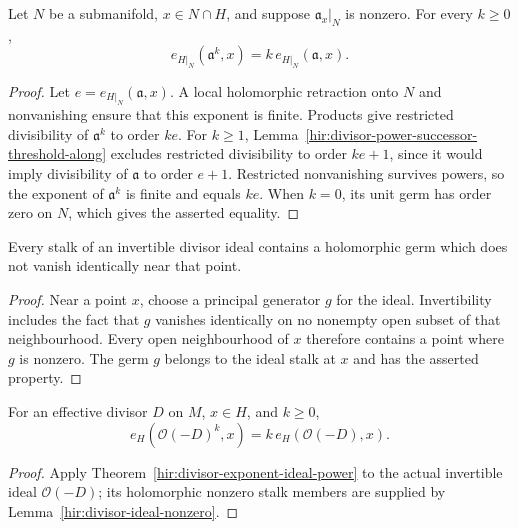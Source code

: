 \begin{theorem}
\label{hir:divisor-exponent-ideal-power-along}
\leanok
Let $N$ be a submanifold, $x\in N\cap H$, and suppose
$\mathfrak a_x|_N$ is nonzero. For every $k\geq0$,
\[
 e_{H|_N}(\mathfrak a^k,x)=k\,e_{H|_N}(\mathfrak a,x).
\]
\end{theorem}
\begin{proof}
Let $e=e_{H|_N}(\mathfrak a,x)$.  A local holomorphic retraction
onto $N$ and nonvanishing ensure that this exponent is finite.
Products give restricted divisibility of $\mathfrak a^k$ to order $ke$.
For $k\geq1$, Lemma~\ref{hir:divisor-power-successor-threshold-along}
excludes restricted divisibility to order $ke+1$, since it would imply
divisibility of $\mathfrak a$ to order $e+1$. Restricted nonvanishing
survives powers, so the exponent of $\mathfrak a^k$ is finite and equals
$ke$. When $k=0$, its unit germ has order zero on $N$, which gives
the asserted equality.
\end{proof}

\begin{lemma}
\label{hir:divisor-ideal-nonzero}
\leanok
Every stalk of an invertible divisor ideal contains a holomorphic germ
which does not vanish identically near that point.
\end{lemma}
\begin{proof}
Near a point $x$, choose a principal generator $g$ for the ideal.
Invertibility includes the fact that $g$ vanishes identically on no
nonempty open subset of that neighbourhood. Every open neighbourhood
of $x$ therefore contains a point where $g$ is nonzero. The germ $g$
belongs to the ideal stalk at $x$ and has the asserted property.
\end{proof}

\begin{corollary}
\label{hir:divisor-ideal-power-multiplicity}
\leanok
For an effective divisor $D$ on $M$, $x\in H$, and $k\geq0$,
\[
 e_H(\mathcal O(-D)^k,x)=k\,e_H(\mathcal O(-D),x).
\]
\end{corollary}
\begin{proof}
Apply Theorem~\ref{hir:divisor-exponent-ideal-power} to the actual
invertible ideal $\mathcal O(-D)$; its holomorphic nonzero stalk members
are supplied by Lemma~\ref{hir:divisor-ideal-nonzero}.
\end{proof}


